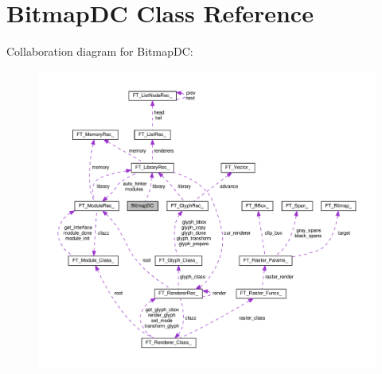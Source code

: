 \hypertarget{classBitmapDC}{}\section{Bitmap\+DC Class Reference}
\label{classBitmapDC}


Collaboration diagram for Bitmap\+DC\+:
\nopagebreak
\begin{figure}[H]
\begin{center}
\leavevmode
\includegraphics[width=350pt]{classBitmapDC__coll__graph}
\end{center}
\end{figure}
